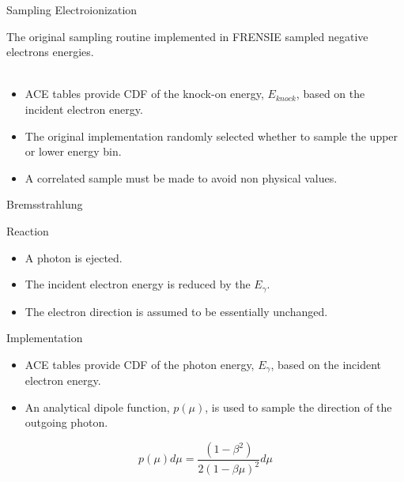 \documentclass{beamer}
\begin{document}
\begin{frame}{Sampling Electroionization}
  
{\large The original sampling routine implemented in FRENSIE sampled negative electrons energies. } \\ 
~~\\

  \begin{itemize}
    \item ACE tables provide CDF of the knock-on energy, $E_{knock}$, based on the incident electron energy.
    \item The original implementation randomly selected whether to sample the upper or lower energy bin.
    \item A correlated sample must be made to avoid non physical values.
  \end{itemize}

\end{frame}


\begin{frame}{Bremsstrahlung}
  \begin{block}{Reaction}
  \begin{itemize}
    \item A photon is ejected.
    \item The incident electron energy is reduced by the $E_{\gamma}$.
    \item The electron direction is assumed to be essentially unchanged.
      \end{itemize}
  \end{block}  
      
  \begin{block}{Implementation}

    \begin{itemize}
    \item ACE tables provide CDF of the photon energy, $E_{\gamma}$, based on the incident electron energy.
    \item An analytical dipole function, $p(\mu)$, is used to sample the direction of the outgoing photon.
  \end{itemize}
  \begin{equation*}
    p(\mu)d\mu = \frac{(1-\beta^2)}{2(1-\beta\mu)^2}d\mu
  \end{equation*}
  \end{block}  

\end{frame}
\end{document}
